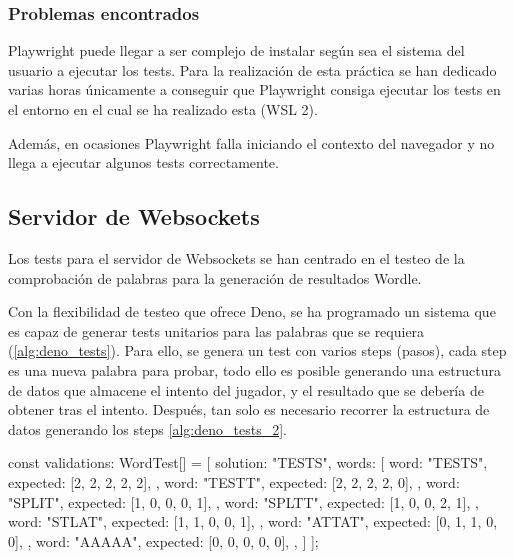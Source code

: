 \subsubsection{Problemas encontrados}
Playwright puede llegar a ser complejo de instalar según sea el sistema del usuario a ejecutar los tests. Para la realización de esta práctica se han dedicado varias horas únicamente a conseguir que Playwright consiga ejecutar los tests en el entorno en el cual se ha realizado esta (WSL 2).


Además, en ocasiones Playwright falla iniciando el contexto del navegador y no llega a ejecutar algunos tests correctamente.

\subsection{Servidor de Websockets}
Los tests para el servidor de Websockets se han centrado en el testeo de la comprobación de palabras para la generación de resultados Wordle.

Con la flexibilidad de testeo que ofrece Deno, se ha programado un sistema que es capaz de generar tests unitarios para las palabras que se requiera (\ref{alg:deno_tests}). Para ello, se genera un test con varios steps (pasos), cada step es una nueva palabra para probar, todo ello es posible generando una estructura de datos que almacene el intento del jugador, y el resultado que se debería de obtener tras el intento. Después, tan solo es necesario recorrer la estructura de datos generando los steps \ref{alg:deno_tests_2}.

\begin{mytypescript}[float={!h},caption={Implementación del sistema de creación de test automáticos.},label={alg:deno_tests}]
	const validations: WordTest[] = [
		{ solution: "TESTS", words: [
			{
				word: "TESTS",
				expected: [2, 2, 2, 2, 2],
			},
			{
				word: "TESTT",
				expected: [2, 2, 2, 2, 0],
			},
			{
				word: "SPLIT",
				expected: [1, 0, 0, 0, 1],
			},
			{
				word: "SPLTT",
				expected: [1, 0, 0, 2, 1],
			},
			{
				word: "STLAT",
				expected: [1, 1, 0, 0, 1],
			},
			{
				word: "ATTAT",
				expected: [0, 1, 1, 0, 0],
			},
			{
				word: "AAAAA",
				expected: [0, 0, 0, 0, 0],
			},
			]
		}
	];
\end{mytypescript}

